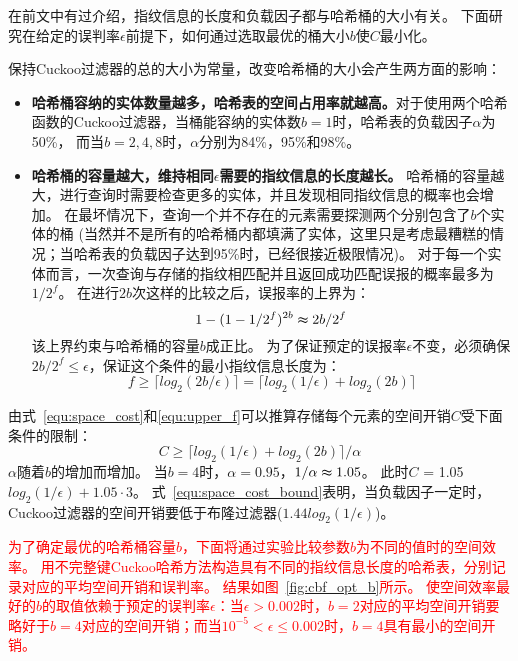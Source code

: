 在前文中有过介绍，指纹信息的长度和负载因子都与哈希桶的大小有关。
下面研究在给定的误判率$\epsilon$前提下，如何通过选取最优的桶大小$b$使$C$最小化。

保持Cuckoo过滤器的总的大小为常量，改变哈希桶的大小会产生两方面的影响：
\begin{itemize}
\item \textbf{哈希桶容纳的实体数量越多，哈希表的空间占用率就越高。}对于使用两个哈希函数的Cuckoo过滤器，当桶能容纳的实体数$b = 1$时，哈希表的负载因子$\alpha$为50\%，
而当$b = 2,4,8$时，$\alpha$分别为84\%，95\%和98\%。
\item \textbf{哈希桶的容量越大，维持相同$\epsilon$需要的指纹信息的长度越长。}
哈希桶的容量越大，进行查询时需要检查更多的实体，并且发现相同指纹信息的概率也会增加。
在最坏情况下，查询一个并不存在的元素需要探测两个分别包含了$b$个实体的桶
(当然并不是所有的哈希桶内都填满了实体，这里只是考虑最糟糕的情况；当哈希表的负载因子达到95\%时，已经很接近极限情况)。
对于每一个实体而言，一次查询与存储的指纹相匹配并且返回成功匹配误报的概率最多为${1/2^f}$。
在进行$2b$次这样的比较之后，误报率的上界为：
\begin{equation}
1 - (1 - {1/2^f})^{2b} \thickapprox {2b/2^f}
\end{equation}
该上界约束与哈希桶的容量$b$成正比。
为了保证预定的误报率$\epsilon$不变，必须确保${2b/2^f}\leq \epsilon$，保证这个条件的最小指纹信息长度为：
\begin{equation}
f \geq \lceil log_2({2b/\epsilon})\rceil = \lceil log_2({1/\epsilon}) + log_2(2b)\rceil  
\label{equ:upper_f}
\end{equation}
\end{itemize}

由式~\ref{equ:space_cost}和\ref{equ:upper_f}可以推算存储每个元素的空间开销$C$受下面条件的限制：
\begin{equation}
C \geq {\lceil log_2({1/\epsilon}) + log_2(2b)\rceil /\alpha}
\label{equ:space_cost_bound}
\end{equation}
$\alpha$随着$b$的增加而增加。
当$b = 4$时，$\alpha = 0.95$，${1/\alpha} \thickapprox 1.05$。
此时$C$ = 1.05$log_2({1/\epsilon}) + 1.05\cdot 3$。
式~\ref{equ:space_cost_bound}表明，当负载因子一定时，Cuckoo过滤器的空间开销要低于布隆过滤器($1.44log_2({1/\epsilon})$)。

\textcolor{red}{为了确定最优的哈希桶容量$b$，下面将通过实验比较参数$b$为不同的值时的空间效率。
用不完整键Cuckoo哈希方法构造具有不同的指纹信息长度的哈希表，分别记录对应的平均空间开销和误判率。
结果如图~\ref{fig:cbf_opt_b}所示。
使空间效率最好的$b$的取值依赖于预定的误判率$\epsilon$：当$\epsilon > 0.002 $时，$b = 2$对应的平均空间开销要略好于$b = 4$对应的空间开销；而当$ 10^{-5} < \epsilon \leq 0.002$时，$b = 4$具有最小的空间开销。}

